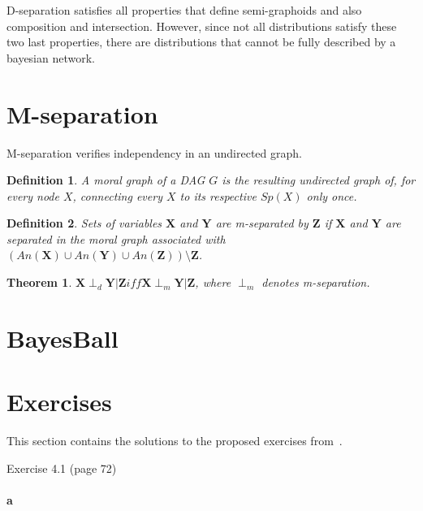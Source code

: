\documentclass{amsart}
\makeatletter
\def\subsection{\@startsection{subsection}{3}%
  \z@{.5\linespacing\@plus.7\linespacing}{.1\linespacing}%
  {\normalfont\itshape}}
\theoremstyle{plain}
\newtheorem*{definition}{Definition}
\newtheorem{theorem}{Theorem}
\makeatother
\begin{document}
D-separation satisfies all properties that define semi-graphoids and also composition and
intersection. However, since not all distributions satisfy these two last properties, there are
distributions that cannot be fully described by a bayesian network.

\section{M-separation}

M-separation verifies independency in an undirected graph.

\begin{definition}
  A moral graph of a DAG $G$ is the resulting undirected graph of, for every node $X$, connecting
  every $X$ to its respective $Sp(X)$ only once.
\end{definition}

\begin{definition}
  Sets of variables $\mathbf{X}$ and $\mathbf{Y}$ are m-separated by $\mathbf{Z}$ if $\mathbf{X}$
  and $\mathbf{Y}$ are separated in the moral graph associated with $(An(\mathbf{X})\cup
  An(\mathbf{Y})\cup An(\mathbf{Z}))\setminus \mathbf{Z}$.
\end{definition}

\begin{theorem}
  $\mathbf{X}\perp_d\mathbf{Y}|\mathbf{Z} iff \mathbf{X}\perp_m\mathbf{Y}|\mathbf{Z}$, where
  $\perp_m$ denotes m-separation.
\end{theorem}

\section{BayesBall}

\section{Exercises}

This section contains the solutions to the proposed exercises from~\cite{bayes-net-darwiche}.

\subsection{Exercise 4.1 (page 72)}

\paragraph{a}
\end{document}
